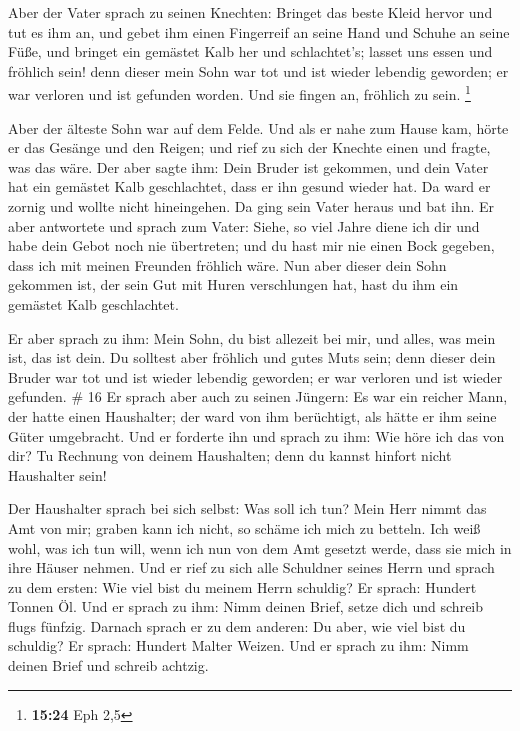  Aber der Vater sprach zu seinen Knechten: Bringet das
beste Kleid hervor und tut es ihm an, und gebet ihm einen Fingerreif an
seine Hand und Schuhe an seine Füße,  und bringet ein
gemästet Kalb her und schlachtet's; lasset uns essen und fröhlich sein!
 denn dieser mein Sohn war tot und ist wieder lebendig
geworden; er war verloren und ist gefunden worden. Und sie fingen an,
fröhlich zu sein. \footnote{\textbf{15:24} Eph 2,5}

 Aber der älteste Sohn war auf dem Felde. Und als er nahe
zum Hause kam, hörte er das Gesänge und den Reigen;  und
rief zu sich der Knechte einen und fragte, was das wäre. 
Der aber sagte ihm: Dein Bruder ist gekommen, und dein Vater hat ein
gemästet Kalb geschlachtet, dass er ihn gesund wieder hat. 
Da ward er zornig und wollte nicht hineingehen. Da ging sein Vater
heraus und bat ihn.  Er aber antwortete und sprach zum
Vater: Siehe, so viel Jahre diene ich dir und habe dein Gebot noch nie
übertreten; und du hast mir nie einen Bock gegeben, dass ich mit meinen
Freunden fröhlich wäre.  Nun aber dieser dein Sohn gekommen
ist, der sein Gut mit Huren verschlungen hat, hast du ihm ein gemästet
Kalb geschlachtet.

 Er aber sprach zu ihm: Mein Sohn, du bist allezeit bei
mir, und alles, was mein ist, das ist dein.  Du solltest
aber fröhlich und gutes Muts sein; denn dieser dein Bruder war tot und
ist wieder lebendig geworden; er war verloren und ist wieder gefunden.
\# 16  Er sprach aber auch zu seinen Jüngern: Es war ein
reicher Mann, der hatte einen Haushalter; der ward von ihm berüchtigt,
als hätte er ihm seine Güter umgebracht.  Und er forderte
ihn und sprach zu ihm: Wie höre ich das von dir? Tu Rechnung von deinem
Haushalten; denn du kannst hinfort nicht Haushalter sein!

 Der Haushalter sprach bei sich selbst: Was soll ich tun?
Mein Herr nimmt das Amt von mir; graben kann ich nicht, so schäme ich
mich zu betteln.  Ich weiß wohl, was ich tun will, wenn ich
nun von dem Amt gesetzt werde, dass sie mich in ihre Häuser nehmen.
 Und er rief zu sich alle Schuldner seines Herrn und sprach
zu dem ersten: Wie viel bist du meinem Herrn schuldig?  Er
sprach: Hundert Tonnen Öl. Und er sprach zu ihm: Nimm deinen Brief,
setze dich und schreib flugs fünfzig.  Darnach sprach er zu
dem anderen: Du aber, wie viel bist du schuldig? Er sprach: Hundert
Malter Weizen. Und er sprach zu ihm: Nimm deinen Brief und schreib
achtzig.

